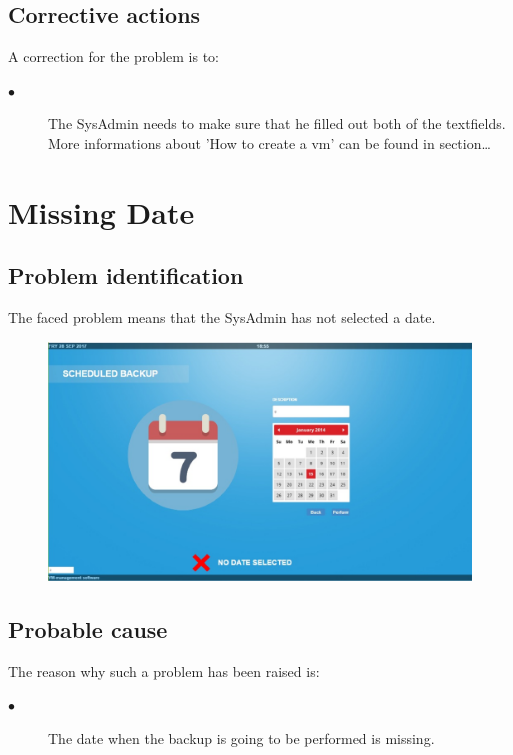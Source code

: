 \subsection{Corrective actions}

A correction for the problem is to:\\
\begin{description}
\item[$\bullet$] The SysAdmin needs to make sure that he filled out both of
the textfields.  More informations about 'How to create a vm' can be found in
section\ldots

\end{description}





\section{Missing Date} 

\subsection{Problem identification}
The faced problem means that the SysAdmin has not selected a date.

\begin{figure}[H]
\centering
\includegraphics[width=170mm]{images/date.eps}
\caption{\label{overflow}}
\end{figure}

\subsection{Probable cause}

The reason why such a problem has been raised is:\\
\begin{description}
\item[$\bullet$] The date when the backup is going to be performed is missing.
\end{description}


